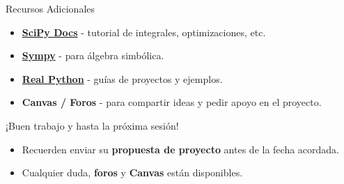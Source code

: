 \documentclass[10pt]{beamer}
\begin{document}
\begin{frame}{Recursos Adicionales}
  \begin{itemize}
    \item \href{https://scipy.org/}{\textbf{SciPy Docs}} - tutorial de integrales, optimizaciones, etc.
    \item \href{https://www.sympy.org/en/index.html}{\textbf{Sympy}} - para álgebra simbólica.
    \item \href{https://realpython.com/}{\textbf{Real Python}} - guías de proyectos y ejemplos.
    \item \textbf{Canvas / Foros} - para compartir ideas y pedir apoyo en el proyecto.
  \end{itemize}
\end{frame}

\begin{frame}
  \Huge{\centerline{¡Buen trabajo y hasta la próxima sesión!}}
  \vspace{0.3cm}
  \normalsize
  \begin{itemize}
    \item Recuerden enviar su \textbf{propuesta de proyecto} antes de la fecha acordada.
    \item Cualquier duda, \textbf{foros} y \textbf{Canvas} están disponibles.
  \end{itemize}
\end{frame}
\end{document}
